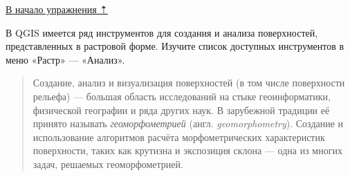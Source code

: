 \documentclass[
  12pt,
]{book}
\begin{document}
\protect\hyperlink{weighted-overlay}{В начало упражнения ⇡}

В QGIS имеется ряд инструментов для создания и анализа поверхностей, представленных в растровой форме. Изучите список доступных инструментов в меню «Растр» --- «Анализ».

\begin{quote}
Создание, анализ и визуализация поверхностей (в том числе поверхности рельефа) --- большая область исследований на стыке геоинформатики, физической географии и ряда других наук. В зарубежной традиции её принято называть \emph{геоморфометрией} (англ. \emph{geomorphometry}). Создание и использование алгоритмов расчёта морфометрических характеристик поверхности, таких как крутизна и экспозиция склона --- одна из многих задач, решаемых геоморфометрией.
\end{quote}
\end{document}
